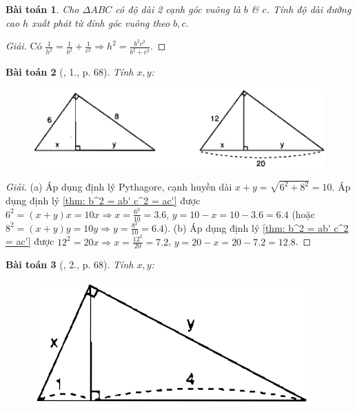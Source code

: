 \documentclass{article}
\newtheorem{baitoan}{Bài toán}
\begin{document}
\begin{baitoan}
	Cho $\Delta ABC$ có độ dài 2 cạnh góc vuông là $b$ \& $c$. Tính độ dài đường cao $h$ xuất phát từ đỉnh góc vuông theo $b,c$.
\end{baitoan}

\begin{proof}[Giải]
	Có $\frac{1}{h^2} = \frac{1}{b^2} + \frac{1}{c^2}\Rightarrow h^2 = \frac{b^2c^2}{b^2 + c^2}$.
\end{proof}

\begin{baitoan}[\cite{SGK_Toan_9_tap_1}, 1., p. 68]
	Tính $x,y$:
	\begin{figure}[H]
		\centering
		\includegraphics[scale=.25]{SGK_Toan_9_4_p68}
	\end{figure}
\end{baitoan}

\begin{proof}[Giải]
	(a) Áp dụng định lý Pythagore, cạnh huyền dài $x + y = \sqrt{6^2 + 8^2} = 10$. Áp dụng định lý \ref{thm: b^2 = ab' c^2 = ac'} được $6^2 = (x + y)x = 10x\Rightarrow x = \frac{6^2}{10} = 3.6$, $y = 10 - x = 10 - 3.6 = 6.4$ (hoặc $8^2 = (x + y)y = 10y\Rightarrow y = \frac{8^2}{10} = 6.4$). (b) Áp dụng định lý \ref{thm: b^2 = ab' c^2 = ac'} được $12^2 = 20x\Rightarrow x = \frac{12^2}{20} = 7.2$, $y = 20 - x = 20 - 7.2 = 12.8$.
\end{proof}

\begin{baitoan}[\cite{SGK_Toan_9_tap_1}, 2., p. 68]
	Tính $x,y$:
	\begin{figure}[H]
		\centering
		\includegraphics[scale=.25]{SGK_Toan_9_5_p68}
	\end{figure}
\end{baitoan}
\end{document}
